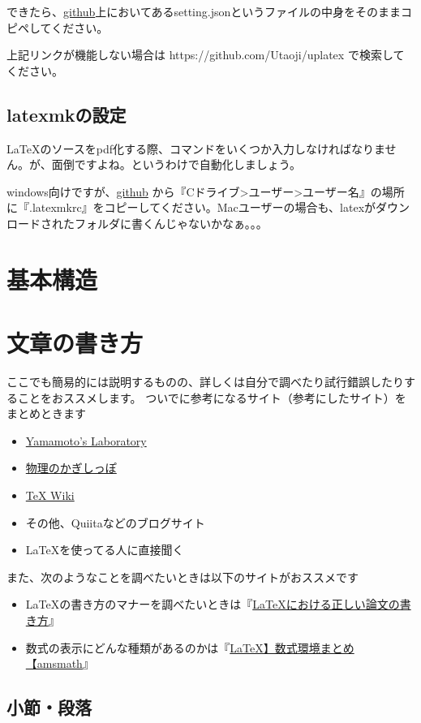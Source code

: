 \documentclass[uplatex,dvipdfmx]{jsarticle}
\numberwithin{equation}{section}
\begin{document}
できたら、\href{https://github.com/Utaoji/uplatex}{github}上においてあるsetting.jsonというファイルの中身をそのままコピペしてください。

上記リンクが機能しない場合は https://github.com/Utaoji/uplatex で検索してください。
\subsection{latexmkの設定}
\LaTeX のソースをpdf化する際、コマンドをいくつか入力しなければなりません。が、面倒ですよね。というわけで自動化しましょう。

windows向けですが、\href{https://github.com/Utaoji/uplatex}{github} から『Cドライブ>ユーザー>ユーザー名』の場所に『.latexmkrc』をコピーしてください。Macユーザーの場合も、latexがダウンロードされたフォルダに書くんじゃないかなぁ。。。
\section{基本構造}
\section{文章の書き方}
ここでも簡易的には説明するものの、詳しくは自分で調べたり試行錯誤したりすることをおススメします。
ついでに参考になるサイト（参考にしたサイト）をまとめときます
\begin{itemize}
  \item \href{http://www.yamamo10.jp/yamamoto/comp/latex/make_doc/cover/index.php}{Yamamoto's Laboratory}
  \item \href{http://hooktail.org/computer/index.php?TeX}{物理のかぎしっぽ}
  \item \href{https://texwiki.texjp.org/}{TeX Wiki}
  \item その他、Quiitaなどのブログサイト
  \item \LaTeX を使ってる人に直接聞く
\end{itemize}
また、次のようなことを調べたいときは以下のサイトがおススメです
\begin{itemize}
  \item \LaTeX の書き方のマナーを調べたいときは『\href{https://qiita.com/birdwatcher/items/5ec42b35d84d3ee2ffbb}{LaTeXにおける正しい論文の書き方}』
  \item 数式の表示にどんな種類があるのかは『\href{https://mathlandscape.com/latex-eq/#toc2}{LaTeX】数式環境まとめ【amsmath}』
\end{itemize}


\subsection{小節・段落}
\end{document}
